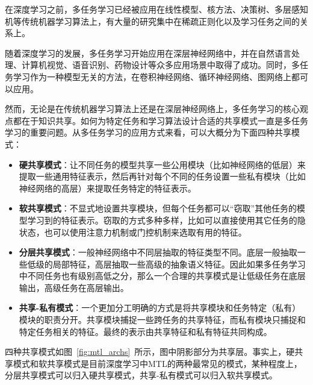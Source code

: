 在深度学习之前，多任务学习已经被应用在线性模型、核方法、决策树、多层感知机等传统机器学习算法上，有大量的研究集中在稀疏正则化\cite{DBLP:conf/nips/ArgyriouEP06}\cite{DBLP:conf/colt/LouniciPTG09}以及学习任务之间的关系\cite{DBLP:journals/jmlr/EvgeniouMP05}\cite{DBLP:conf/nips/JacobBV08}上。

随着深度学习的发展，多任务学习开始应用在深层神经网络中，并在自然语言处理\cite{DBLP:conf/icml/CollobertW08}、计算机视觉\cite{DBLP:conf/cvpr/MisraSGH16}、语音识别\cite{DBLP:conf/icassp/DengHK13}、药物设计\cite{DBLP:journals/corr/RamsundarKRWKP15}等众多应用场景中取得了成功。同时，多任务学习作为一种模型无关的方法，在卷积神经网络\cite{DBLP:conf/icml/CollobertW08}\cite{DBLP:conf/cvpr/MisraSGH16}、循环神经网络\cite{DBLP:conf/ijcai/LiuQH16}、图网络\cite{liu2018multi}上都可以应用。

然而，无论是在传统机器学习算法上还是在深层神经网络上，多任务学习的核心观点都在于知识共享。如何为特定任务和学习算法设计合适的共享模式一直是多任务学习的重要问题。从多任务学习的应用方式来看，可以大概分为下面四种共享模式\cite{book:nndl}：

\begin{itemize}
	\item \textbf{硬共享模式}：让不同任务的模型共享一些公用模块（比如神经网络的低层）来提取一些通用特征表示，然后再针对每个不同的任务设置一些私有模块（比如神经网络的高层）来提取任务特定的特征表示。
	\item \textbf{软共享模式}：不显式地设置共享模块，但每个任务都可以“窃取”其他任务的模型学习到的特征表示。窃取的方式多种多样，比如可以直接使用其它任务的隐状态，也可以使用注意力机制或门控机制来选取有用的特征。
	\item \textbf{分层共享模式}：一般神经网络中不同层抽取的特征类型不同。底层一般抽取一些低级的局部特征，高层抽取一些高级的抽象语义特征。因此如果多任务学习中不同任务也有级别高低之分，那么一个合理的共享模式是让低级任务在底层输出，高级任务在高层输出。
	\item \textbf{共享-私有模式}：一个更加分工明确的方式是将共享模块和任务特定（私有）模块的职责分开。共享模块捕捉一些跨任务的共享特征，而私有模块只捕捉和特定任务相关的特征。最终的表示由共享特征和私有特征共同构成。
\end{itemize}
四种共享模式如图~\ref{fig:mtl_archs}~所示，图中阴影部分为共享层。事实上，硬共享模式和软共享模式是目前深度学习中MTL的两种最常见的模式，某种程度上，分层共享模式可以归入硬共享模式，共享-私有模式可以归入软共享模式。

